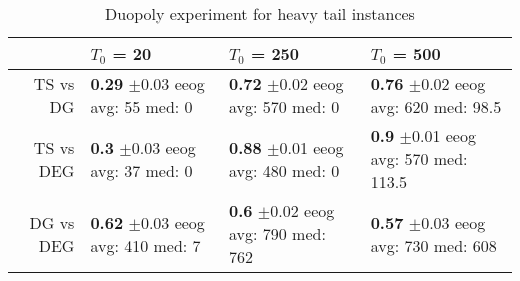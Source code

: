 \documentclass[../competing_bandits.tex]{subfiles}
\begin{document}
\begin{table}[ht]
\centering
\caption{Duopoly experiment for heavy tail instances}
\begin{tabular}{rlll}
  \hline
 & $T_0$ = 20 & $T_0$ = 250 & $T_0$ = 500 \\ 
  \hline
TS vs DG & \makecell{\textbf{0.29} $\pm$0.03\\ eeog \\ avg: 55\\ med: 0} & \makecell{\textbf{0.72} $\pm$0.02\\ eeog \\ avg: 570\\ med: 0} & \makecell{\textbf{0.76} $\pm$0.02\\ eeog \\ avg: 620\\ med: 98.5} \\ 
  TS vs DEG & \makecell{\textbf{0.3} $\pm$0.03\\ eeog \\ avg: 37\\ med: 0} & \makecell{\textbf{0.88} $\pm$0.01\\ eeog \\ avg: 480\\ med: 0} & \makecell{\textbf{0.9} $\pm$0.01\\ eeog \\ avg: 570\\ med: 113.5} \\ 
  DG vs DEG & \makecell{\textbf{0.62} $\pm$0.03\\ eeog \\ avg: 410\\ med: 7} & \makecell{\textbf{0.6} $\pm$0.02\\ eeog \\ avg: 790\\ med: 762} & \makecell{\textbf{0.57} $\pm$0.03\\ eeog \\ avg: 730\\ med: 608} \\ 
   \hline
\end{tabular}
\label{sim_ht}
\end{table}
\end{document}
